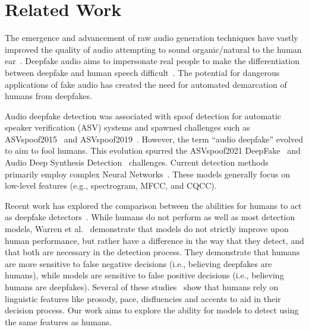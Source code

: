 \section{Related Work}
\label{sec:relwork} 
 
The emergence and advancement of raw audio generation techniques have vastly improved the quality of audio attempting to sound organic/natural to the human ear~\cite{oord_wavenet_2016, oord_parallel_2017,baird2018the,kim_flowavenet_2019}.  Deepfake audio aims to impersonate real people to make the differentiation between deepfake and human speech
difficult~\cite{lorenzo-trueba_can_2018, SaundersDetectingDF}.  The potential for dangerous applications of fake audio has created the need for automated demarcation of humans from deepfakes. 

Audio deepfake detection was associated with spoof detection for automatic speaker verification (ASV) systems and spawned challenges such as ASVspoof2015~\cite{wu_asvspoof_2015} and ASVspoof2019~\cite{todisco_asvspoof_2019}.  However, the term ``audio
deepfake'' evolved to aim to fool humans.  This evolution spurred the
ASVspoof2021 DeepFake~\cite{yamagishi_asvspoof_2021} and Audio Deep Synthesis Detection~\cite{yi2022add}  challenges. Current detection methods primarily employ complex Neural Networks~\cite{
wang2020deepsonar,wang2021investigating, wijethunga_deepfake_2020,jiang2020self,subramani2020learning,zhang2021fake, khalid2021evaluation,tak2022automatic,martin2022vicomtech}.  These models generally focus on low-level features (e.g., spectrogram, MFCC, and CQCC). 


Recent work has explored the comparison between the abilities for humans to act as deepfake detectors~\cite{muller2022,warning_humans,wenger2021,allyour}. While humans do not perform as well as most detection models, Warren et al.~\cite{WTC_24} demonstrate that models do not strictly improve upon human performance, but rather have a difference in the way that they detect, and that both are necessary in the detection process. They demonstrate that humans are more sensitive to false negative decisions (i.e., believing deepfakes are humans), while models are sensitive to false positive decisions (i.e., believing humans are deepfakes). Several of these studies~\cite{WTC_24,warning_humans} show that humans rely on linguistic features like prosody, pace, disfluencies and accents to aid in their decision process. Our work aims to explore the ability for models to detect using the same features as humans.